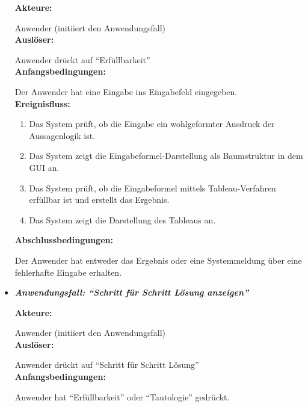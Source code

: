 \begin{itemize}
\textbf{Akteure:}

Anwender (initiiert den Anwendungsfall)\\

\textbf{Auslöser:}

Anwender drückt auf ``Erfüllbarkeit''\\

\textbf{Anfangsbedingungen:}

Der Anwender hat eine Eingabe ins Eingabefeld eingegeben.\\
 
\textbf{Ereignisfluss:}
\begin{enumerate}
\item Das System prüft, ob die Eingabe ein wohlgeformter Ausdruck der Aussagenlogik ist. 
\item Das System zeigt die Eingabeformel-Darstellung als Baumstruktur in dem GUI an.
\item Das System prüft, ob die Eingabeformel mittels Tableau-Verfahren erfüllbar ist und erstellt das Ergebnis.
\item Das System zeigt die Darstellung des Tableaus an.
\end{enumerate}

\textbf{Abschlussbedingungen:}

Der Anwender hat entweder das Ergebnis oder eine Systemmeldung über eine fehlerhafte Eingabe erhalten.\\

\item \textit{\textbf{Anwendungsfall: ``Schritt für Schritt Lösung anzeigen''}}

\textbf{Akteure:}

Anwender (initiiert den Anwendungsfall)\\

\textbf{Auslöser:}

Anwender drückt auf ``Schritt für Schritt Lösung''\\

\textbf{Anfangsbedingungen:}

Anwender hat ``Erfüllbarkeit'' oder ``Tautologie'' gedrückt.\\


\end{itemize}
